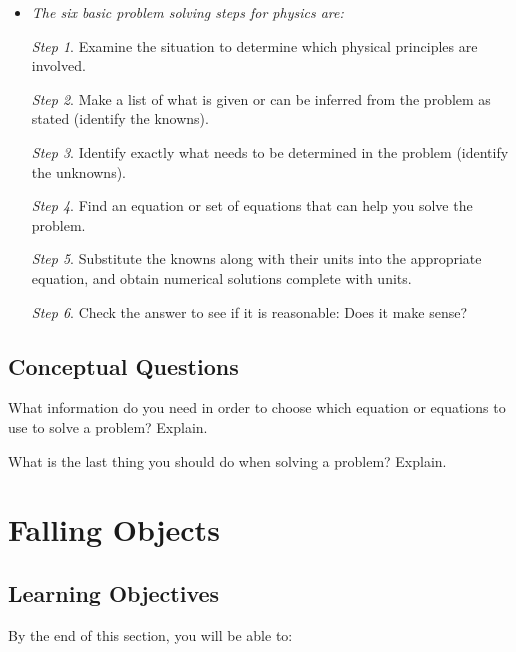 \documentclass[
]{book}
\begin{document}
\begin{itemize}
\item
  \protect\hypertarget{import-auto-id927917}{}{\emph{The six basic problem solving steps for physics
  are:}}

  \emph{Step 1}. Examine the situation to determine which physical
  principles are involved.

  \emph{Step 2}. Make a list of what is given or can be inferred from the
  problem as stated (identify the knowns).

  \emph{Step 3}. Identify exactly what needs to be determined in the
  problem (identify the unknowns).

  \emph{Step 4}. Find an equation or set of equations that can help you
  solve the problem.

  \emph{Step 5}. Substitute the knowns along with their units into the
  appropriate equation, and obtain numerical solutions complete with
  units.

  \emph{Step 6}. Check the answer to see if it is reasonable: Does it make
  sense?
\end{itemize}

\hypertarget{fs-id2577484}{}
\hypertarget{conceptual-questions-4}{%
\subsection{Conceptual Questions}\label{conceptual-questions-4}}

\hypertarget{fs-id4087579}{}
\leavevmode{}%
What information do you need in order to choose which equation or
equations to use to solve a problem? Explain.

\hypertarget{fs-id1986766}{}
\leavevmode{}%
What is the last thing you should do when solving a problem? Explain.

\hypertarget{falling-objects}{%
\section{Falling Objects}\label{falling-objects}}

\hypertarget{fs-id3275688}{}
\hypertarget{learning-objectives-5}{%
\subsection{Learning Objectives}\label{learning-objectives-5}}

By the end of this section, you will be able to:
\end{document}
